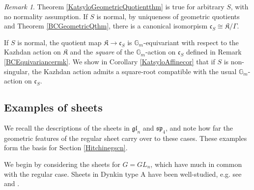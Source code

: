 \documentclass{amsart}
\theoremstyle{remark}
\newtheorem{remark}[theorem]{Remark}
\numberwithin{theorem}{section}
\numberwithin{equation}{section}
\begin{document}
\begin{remark}\label{KatsyloGQrmk}
    Theorem \ref{KatsyloGeometricQuotientthm} is true for arbitrary $S$, with no normality assumption. If $S$ is normal, by uniqueness of geometric quotients and Theorem \ref{BCGeometricQthm}, there is a canonical isomorpism $\mathfrak{c}_S \cong \mathfrak{K}/\Gamma$. 
    
    If $S$ is normal, the quotient map $\mathfrak{K} \rightarrow \mathfrak{c}_S$ is $\mathbb{G}_m$-equivariant with respect to the Kazhdan action on $\mathfrak{K}$ and the \emph{square} of the $\mathbb{G}_m$-action on $\mathfrak{c}_S$ defined in Remark \ref{BCEquivariancermk}. We show in Corollary \ref{KatsyloAffinecor} that if $S$ is non-singular, the Kazhdan action admits a square-root compatible with the usual $\mathbb{G}_m$-action on $\mathfrak{c}_S$.
\end{remark}

\subsection{Examples of sheets}\label{Sheetsegsbn}
We recall the descriptions of the sheets in $\mathfrak{gl}_n$ and $\mathfrak{sp}_4$, and note how far the geometric features of the regular sheet carry over to these cases. These examples form the basis for Section \ref{Hitchinegscn}. 

We begin by considering the sheets for $G=GL_n$, which have much in common with the regular case. Sheets in Dynkin type A have been well-studied, e.g. see \cite{OW} and \cite{Kraft}.
\end{document}
